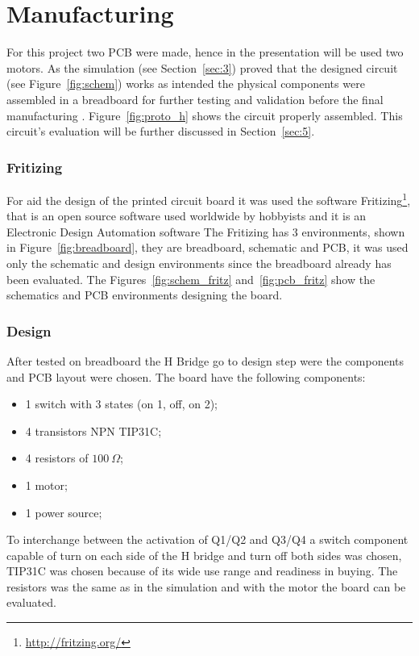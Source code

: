 \section{\textbf{Manufacturing}}\label{sec:4}
    For this project two PCB were made, hence in the presentation will be used two motors.
    As the simulation (see Section~\ref{sec:3}) proved that the designed circuit (see Figure~\ref{fig:schem}) works as intended the physical components were assembled in a breadboard for further testing and validation before the final manufacturing . Figure~\ref{fig:proto_h} shows the circuit properly assembled. This circuit's evaluation will be further discussed in Section~\ref{sec:5}.

    \subsubsection{Fritizing} %
    \label{ssub:fritizing}
        For aid the design of the printed circuit board it was used the software Fritizing\footnote{\url{http://fritzing.org/}}, that is an open source software used worldwide by hobbyists and it is an Electronic Design Automation software
        The Fritizing has 3 environments, shown in Figure~\ref{fig:breadboard}, they are breadboard, schematic and PCB, it was used only the schematic and design environments since the breadboard already has been evaluated. The Figures~\ref{fig:schem_fritz} and~\ref{fig:pcb_fritz} show the schematics and PCB environments designing the board.

    \subsubsection{Design} %
    \label{ssub:design}
        After tested on breadboard the H Bridge go to design step were the components and PCB layout were chosen. The board have the following components:
        \begin{itemize}
            \item 1 switch with 3 states (on 1, off, on 2);
            \item 4 transistors NPN TIP31C;
            \item 4 resistors of $100\:\Omega$;
            \item 1 motor;
            \item 1 power source;
        \end{itemize}
        To interchange between the activation of Q1/Q2 and Q3/Q4 a switch component capable of turn on each side of the H bridge and turn off both sides was chosen, TIP31C was chosen because of its wide use range and readiness in buying. The resistors was the same as in the simulation and with the motor the board can be evaluated.

